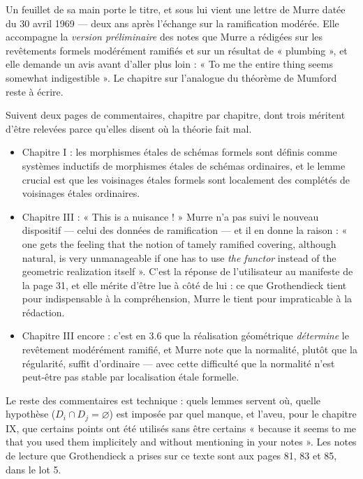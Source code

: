\documentclass[11pt,a4paper]{article}
\begin{document}
Un feuillet de sa main porte le titre, et sous lui vient une lettre de Murre
datée du 30 avril 1969 --- deux ans après l'échange sur la ramification
modérée. Elle accompagne la \emph{version préliminaire} des notes que Murre a
rédigées sur les revêtements formels modérément ramifiés et sur un résultat de
« plumbing », et elle demande un avis avant d'aller plus loin : « To me the
entire thing seems somewhat indigestible ». Le chapitre sur l'analogue du
théorème de Mumford reste à écrire.

Suivent deux pages de commentaires, chapitre par chapitre, dont trois méritent
d'être relevées parce qu'elles disent où la théorie fait mal.

\begin{itemize}
  \item Chapitre I : les morphismes étales de schémas formels sont définis
    comme systèmes inductifs de morphismes étales de schémas ordinaires, et le
    lemme crucial est que les voisinages étales formels sont localement des
    complétés de voisinages étales ordinaires.
  \item Chapitre III : « This is a nuisance ! » Murre n'a pas suivi le nouveau
    dispositif --- celui des données de ramification --- et il en donne la
    raison : « one gets the feeling that the notion of tamely ramified covering,
    although natural, is very unmanageable if one has to use \emph{the functor}
    instead of the geometric realization itself ». C'est la réponse de
    l'utilisateur au manifeste de la page 31, et elle mérite d'être lue à côté
    de lui : ce que Grothendieck tient pour indispensable à la compréhension,
    Murre le tient pour impraticable à la rédaction.
  \item Chapitre III encore : c'est en 3.6 que la réalisation géométrique
    \emph{détermine} le revêtement modérément ramifié, et Murre note que la
    normalité, plutôt que la régularité, suffit d'ordinaire --- avec cette
    difficulté que la normalité n'est peut-être pas stable par localisation
    étale formelle.
\end{itemize}

Le reste des commentaires est technique : quels lemmes servent où, quelle
hypothèse ($D_{i} \cap D_{j} = \varnothing$) est imposée par quel manque, et
l'aveu, pour le chapitre IX, que certains points ont été utilisés sans être
certains « because it seems to me that you used them implicitely and without
mentioning in your notes ». Les notes de lecture que Grothendieck a prises sur
ce texte sont aux pages 81, 83 et 85, dans le lot 5.
\end{document}
